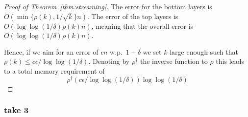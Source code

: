 \documentclass[anon,12pt]{colt2019} %
\newcommand{\eps}{\epsilon}
\begin{document}
\begin{proof} [Proof of Theorem~\ref{thm:streaming}]
The error for the bottom layers is $O(\min\{\rho(k), 1/\sqrt{k}\} n)$. The error of the top layers is $O(\log\log(1/\delta) \rho(k) n)$, meaning that the overall error is $O(\log\log(1/\delta) \rho(k) n)$.

Hence, if we aim for an error of $\eps n$ w.p.\ $1-\delta$ we set $k$ large enough such that $\rho(k) \leq c \eps / \log\log(1/\delta)$. Denoting by $\rho^{\dagger}$ the inverse function to $\rho$ this leads to a total memory requirement of 
$$ \rho^{\dagger}(c \eps / \log\log(1/\delta)) \log\log(1/\delta) $$

\end{proof}


%
%
%
%
%
%
%
%
%
%
%


\subsubsection{take 3}
\end{document}

